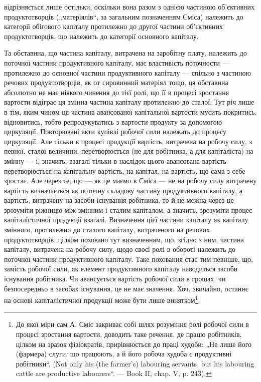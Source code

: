 \parcont{}  %
відрізняється лише остільки, оскільки вона разом з однією частиною об’єктивних
продуктотворців („матеріялів“, за загальним позначенням Сміса)
належить до категорії обігового капіталу протилежно до другої частини
об’єктивних продуктотворців, що належить до категорії основного капіталу.

Та обставина, що частина капіталу, витрачена на заробітну плату, належить
до поточної частини продуктивного капіталу, має властивість поточности
— протилежно до основної частини продуктивного капіталу —
спільно з частиною речових продуктотворців, як от сировинний матеріял
тощо, ця обставина абсолютно не має ніякого чинення до тієї ролі, що
її в процесі зростання вартости відіграє ця змінна частина капіталу протилежно
до сталої. Тут річ лише в тім, яким чином ця частина авансованої
капітальної вартости мусить покритись, відновитись, тобто репродукуватись
з вартости продукту за допомогою циркуляції. Повторювані
акти купівлі робочої сили належать до процесу циркуляції. Але тільки
в процесі продукції вартість, витрачена на робочу силу, з певної, сталої
величини, перетворюється (не для робітника, а для капіталіста) на змінну —
і, значить, взагалі тільки в наслідок цього авансована вартість перетворюється
на капітальну вартість, на капітал, на вартість, що сама з себе
зростає. Але через те, що — як це маємо в Сміса — не на робочу силу
витрачену вартість визначається як поточну складову частину продуктивного
капіталу, а вартість, витрачену на засоби існування робітника, то й
не можна через це зрозуміти ріжницю між змінним і сталим капіталом, а
значить, зрозуміти процес капіталістичної продукції взагалі. Визначення
цієї частини капіталу як капіталу змінного, протилежно до сталого капіталу,
витраченого на речових продуктотворців, цілком поховано тут
визначенням, що, згідно з ним, частина капіталу, витрачена на робочу силу,
щодо своєї ролі в обороті належить до поточної частини продуктивного
капіталу. Таке поховання стає тим певніше, що, замість робочої
сили, як елемент продуктивного капіталу наводиться засоби існування
робітника. Чи авансується вартість робочої сили в грошах, чи безпосередньо
в засобах існування, це не має значення. Хоч, звичайно, останнє
на основі капіталістичної продукції може бути лише винятком\footnote{
До якої міри сам А. Сміс закриває собі шлях розуміння ролі робочої
сили в процесі зростання вартости, доводить таке речення, де працю робітників,
цілком на зразок фізіократів, прирівнюється до праці худоби: „Не лише його
(фармера) слуги, що працюють, а й його робоча худоба є продуктивні робітники“.
(Not only his (the farmer’s) labouring servants, but his labouring cattle are
productive labourers“. — Book II, chap. V, p. 243).
}.

